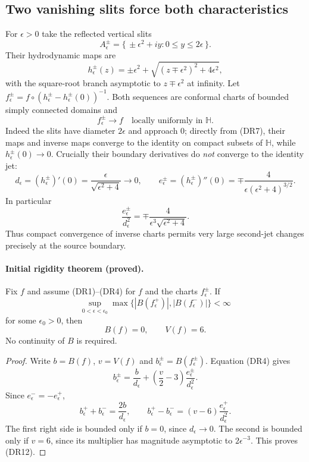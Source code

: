 \documentclass[11pt]{article}
\theoremstyle{definition}\newtheorem{definition}[theorem]{Definition}
\theoremstyle{remark}\newtheorem{remark}[theorem]{Remark}
\begin{document}
\subsection{Two vanishing slits force both characteristics}

For $\epsilon>0$ take the reflected vertical slits
\[
 A_\epsilon^\pm
  =\{\,\pm\epsilon^2+iy:0\leq y\leq2\epsilon\,\}.
 \tag{DR6}
\]
Their hydrodynamic maps are
\[
 h_\epsilon^\pm(z)
 =\pm\epsilon^2+
   \sqrt{(z\mp\epsilon^2)^2+4\epsilon^2},
 \tag{DR7}
\]
with the square-root branch asymptotic to $z\mp\epsilon^2$ at infinity.
Let $f_\epsilon^\pm=f\circ
(h_\epsilon^\pm-h_\epsilon^\pm(0))^{-1}$.
Both sequences are conformal charts of bounded simply connected domains and
\[
 f_\epsilon^\pm\longrightarrow f
 \quad\text{locally uniformly in }\mathbb H.
 \tag{DR8}
\]
Indeed the slits have diameter $2\epsilon$ and approach $0$; directly from
(DR7), their maps and inverse maps converge to the identity on compact
subsets of $\mathbb H$, while $h_\epsilon^\pm(0)\to0$.
Crucially their boundary derivatives do \emph{not} converge to the identity
jet:
\[
 d_\epsilon=(h_\epsilon^\pm)'(0)
     =\frac{\epsilon}{\sqrt{\epsilon^2+4}}\longrightarrow0,
 \qquad
 e_\epsilon^\pm=(h_\epsilon^\pm)''(0)
     =\mp\frac{4}{\epsilon(\epsilon^2+4)^{3/2}}.
 \tag{DR9}
\]
In particular
\[
 \frac{e_\epsilon^\pm}{d_\epsilon^2}
 =\mp\frac{4}{\epsilon^3\sqrt{\epsilon^2+4}}.
 \tag{DR10}
\]
Thus compact convergence of inverse charts permits very large second-jet
changes precisely at the source boundary.

\paragraph{Initial rigidity theorem (proved).}
Fix $f$ and assume (DR1)--(DR4) for $f$ and the charts $f_\epsilon^\pm$.
If
\[
 \sup_{0<\epsilon<\epsilon_0}
       \max\{|B(f_\epsilon^+)|,|B(f_\epsilon^-)|\}<\infty
 \tag{DR11}
\]
for some $\epsilon_0>0$, then
\[
 B(f)=0,\qquad V(f)=6.
 \tag{DR12}
\]
No continuity of $B$ is required.

\begin{proof}
Write $b=B(f)$, $v=V(f)$ and $b_\epsilon^\pm=B(f_\epsilon^\pm)$.
Equation (DR4) gives
\[
 b_\epsilon^\pm
 =\frac b{d_\epsilon}
    +\left(\frac v2-3\right)
                       \frac{e_\epsilon^\pm}{d_\epsilon^2}.
\]
Since $e_\epsilon^-=-e_\epsilon^+$,
\[
 b_\epsilon^++b_\epsilon^-=\frac{2b}{d_\epsilon},\qquad
 b_\epsilon^+-b_\epsilon^-=
       (v-6)\frac{e_\epsilon^+}{d_\epsilon^2}.
 \tag{DR13}
\]
The first right side is bounded only if $b=0$, since
$d_\epsilon\to0$.  The second is bounded only if $v=6$, since its multiplier
has magnitude asymptotic to $2\epsilon^{-3}$.  This proves (DR12).
\end{proof}
\end{document}

